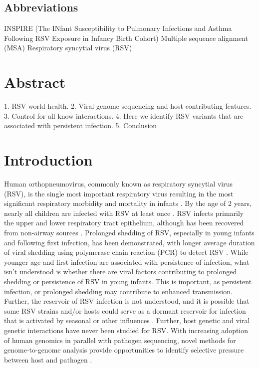 \documentclass{article}
\begin{document}
\linenumbers
\subsection*{Abbreviations}
 INSPIRE (The INfant Susceptibility to Pulmonary Infections and Asthma Following RSV Exposure in Infancy Birth Cohort)
Multiple sequence alignment (MSA)
Respiratory syncytial virus (RSV)

\section{Abstract}
1. RSV world health.
2. Viral genome sequencing and host contributing features.
3. Control for all know interactions.
4. Here we identify RSV variants that are associated with persistent infection.
5. Conclusion

\section{Introduction}
Human orthopneumovirus, commonly known as respiratory syncytial virus (RSV), is the single most important respiratory virus resulting in the most significant respiratory morbidity and mortality in infants 
\cite{hall_burden_2009}.
By the age of 2 years, nearly all children are infected with RSV at least once 
\cite{glezen_risk_1986}.
RSV infects primarily the upper and lower respiratory tract epithelium, although has been recovered from non-airway sources 
\cite{bokun_respiratory_2019,
cubie_detection_1997,
nadal_isolation_1990,
odonnell_respiratory_1998,
rezaee_respiratory_2011,
rohwedder_detection_1998}.
Prolonged shedding of RSV, especially in young infants and following first infection, has been demonstrated, with longer average duration of viral shedding using polymerase chain reaction (PCR) to detect RSV 
\cite{munywoki_influence_2015}.
While younger age and first infection are associated with persistence of infection, what isn't understood is whether there are viral factors contributing to prolonged shedding or persistence of RSV in young infants. 
This is important, as persistent infection, or prolonged shedding may contribute to enhanced transmission. 
Further, the reservoir of RSV infection is not understood, 
and it is possible that some RSV strains and/or hosts could serve as a dormant reservoir for infection that is activated by seasonal or other influences 
\cite{hobson_persistent_2008}.
Further, host genetic and viral genetic interactions have never been studied for RSV.
With increasing adoption of human genomics in parallel with pathogen sequencing, novel methods for genome-to-genome analysis provide opportunities to identify selective pressure between host and pathogen \cite{naret2018correcting}.
\end{document}
